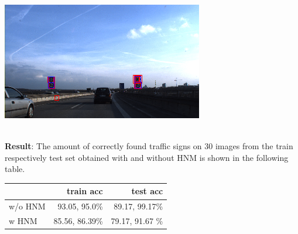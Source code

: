 \documentclass[a0paper,portrait]{baposter}
\begin{document}
\begin{poster}
{\begin{minipage}{\textwidth}
\centering
\includegraphics[width=0.65\linewidth]{test144_wb_predboxes2.png}
\end{minipage}\\

\textbf{Result}: The amount of correctly found traffic signs on 30 images from the train respectively test set obtained with and without HNM is shown in the following table. 

\centering
\small
\begin{tabular}{ l | r r }
  &  train acc & test acc \\ \toprule
  w/o HNM & 93.05, 95.0\% & 89.17, 99.17\% \\
  w HNM & 85.56, 86.39\%  & 79.17, 91.67 \% \\
\end{tabular}

}


\end{poster}
\end{document}
